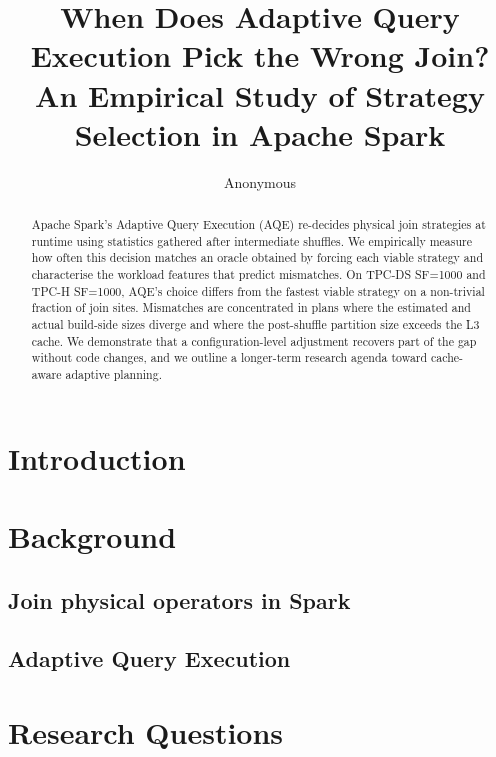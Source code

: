 \documentclass[a4paper,UKenglish,cleveref,autoref,thm-restate]{lipics-v2021}
\title{When Does Adaptive Query Execution Pick the Wrong Join?\\
       An Empirical Study of Strategy Selection in Apache Spark}
\author{Anonymous}{Anonymous}{}{}{}
\begin{document}
\maketitle

\begin{abstract}
Apache Spark's Adaptive Query Execution (AQE) re-decides physical join
strategies at runtime using statistics gathered after intermediate shuffles.
We empirically measure how often this decision matches an oracle obtained by
forcing each viable strategy and characterise the workload features that
predict mismatches. On TPC-DS SF=1000 and TPC-H SF=1000, AQE's choice differs
from the fastest viable strategy on a non-trivial fraction of join sites.
Mismatches are concentrated in plans where the estimated and actual build-side
sizes diverge and where the post-shuffle partition size exceeds the L3 cache.
We demonstrate that a configuration-level adjustment recovers part of the gap
without code changes, and we outline a longer-term research agenda toward
cache-aware adaptive planning.
\end{abstract}

\section{Introduction}

\section{Background}
\subsection{Join physical operators in Spark}
\subsection{Adaptive Query Execution}

\section{Research Questions}
\label{sec:rq}
\end{document}
